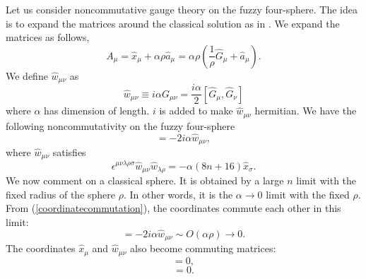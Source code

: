 \documentclass[a4paper,11pt]{article}
\begin{document}
\vspace{0.5cm} 

Let us consider noncommutative gauge theory on the fuzzy four-sphere. 
The idea is to expand the matrices around the classical solution as in 
\cite{AIIKKT,IKTW,yk2}. 
We expand the matrices as follows, 
\begin{equation}
A_{\mu}=\hat{x}_{\mu}+ \alpha \rho \hat{a}_{\mu} 
=\alpha\rho \left( \frac{1}{\rho}\hat{G}_{\mu}+ \hat{a}_{\mu} \right). 
\label{expansionmatrices}
\end{equation}
We define $\hat{w}_{\mu\nu}$ as 
\begin{equation}
\hat{w}_{\mu\nu}\equiv i\alpha G_{\mu\nu}=
\frac{i\alpha}{2}[\hat{G}_{\mu},\hat{G}_{\nu}]
\end{equation}
where $\alpha$ has dimension of length. 
$i$ is added to make $\hat{w}_{\mu\nu}$ hermitian. 
We have the following noncommutativity on the fuzzy four-sphere 
\begin{equation}
[\hat{x}_{\mu},\hat{x}_{\nu}]=-2i\alpha\hat{w}_{\mu\nu}, 
\label{coordinatecommutation}
\end{equation}
where $\hat{w}_{\mu\nu}$ satisfies 
\begin{equation}
\epsilon^{\mu\nu\lambda\rho\sigma}\hat{w}_{\mu\nu}
\hat{w}_{\lambda\rho}
=-\alpha(8n+16)\hat{x}_{\sigma}.  
\end{equation} 
We now comment on a classical sphere. 
It is obtained by a large $n$ limit with 
the fixed radius of the sphere $\rho$. In other words, it is 
the $\alpha \rightarrow 0$ limit 
with the fixed $\rho$.
From (\ref{coordinatecommutation}), 
the coordinates commute each other 
in this limit:
\begin{equation}
[\hat{x}_{\mu},\hat{x}_{\nu}]=-2i\alpha\hat{w}_{\mu\nu}
 \sim O (\alpha \rho) \rightarrow 0.
\end{equation}
The coordinates $\hat{x}_{\mu}$ and $\hat{w}_{\mu\nu}$ 
also become commuting matrices: 
\begin{equation}
[\hat{x}_{\mu},\hat{w}_{\nu\lambda}]=0, 
\end{equation}
\begin{equation}
[\hat{w}_{\mu\nu},\hat{w}_{\lambda\rho}]=0 .
\end{equation}
\end{document}
